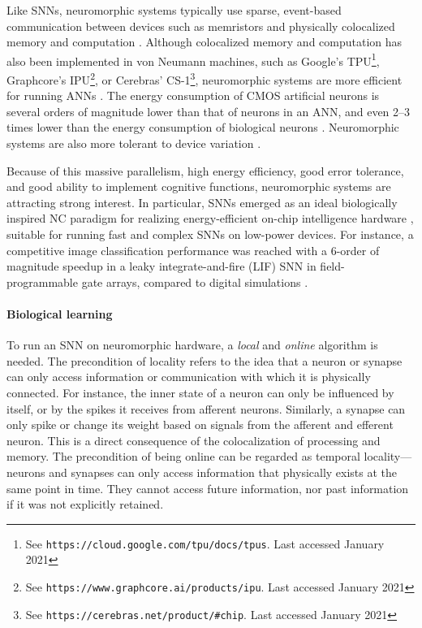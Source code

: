 Like SNNs, neuromorphic systems typically use sparse, event-based communication between devices such as memristors \citep{maan2016survey} and physically colocalized memory and computation \citep{sterling2015principles,neftci2018data}.
Although colocalized memory and computation has also been implemented in von Neumann machines, such as Google's TPU\footnote{See \texttt{https://cloud.google.com/tpu/docs/tpus}. Last accessed January 2021}, Graphcore's IPU\footnote{See \texttt{https://www.graphcore.ai/products/ipu}. Last accessed January 2021}, or Cerebras' CS-1\footnote{See \texttt{https://cerebras.net/product/\#chip}. Last accessed January 2021}, neuromorphic systems are more efficient for running ANNs \citep{merolla2014million,rajendran2019low}.
The energy consumption of CMOS artificial neurons is several orders of magnitude lower than that of neurons in an ANN, and even 2--3 times lower than the energy consumption of biological neurons \citep{elbez2020progressive}.
Neuromorphic systems are also more tolerant to device variation \citep{yu2013low}.

Because of this massive parallelism, high energy efficiency, good error tolerance, and good ability to implement cognitive functions, neuromorphic systems are attracting strong interest.
In particular, SNNs emerged as an ideal biologically inspired NC paradigm for realizing energy-efficient on-chip intelligence hardware \citep{merolla2014million,davies2018loihi}, suitable for running fast and complex SNNs on low-power devices.
For instance, a competitive image classification performance was reached with a 6-order of magnitude speedup in a leaky integrate-and-fire (LIF) SNN in field-programmable gate arrays, compared to digital simulations \citep{zhang2020low}.

\paragraph{Biological learning}
To run an SNN on neuromorphic hardware, a \emph{local} and \emph{online} algorithm is needed.
The precondition of locality refers to the idea that a neuron or synapse can only access information or communication with which it is physically connected.
For instance, the inner state of a neuron can only be influenced by itself, or by the spikes it receives from afferent neurons.
Similarly, a synapse can only spike or change its weight based on signals from the afferent and efferent neuron.
This is a direct consequence of the colocalization of processing and memory.
The precondition of being online can be regarded as temporal locality---neurons and synapses can only access information that physically exists at the same point in time.
They cannot access future information, nor past information if it was not explicitly retained.

